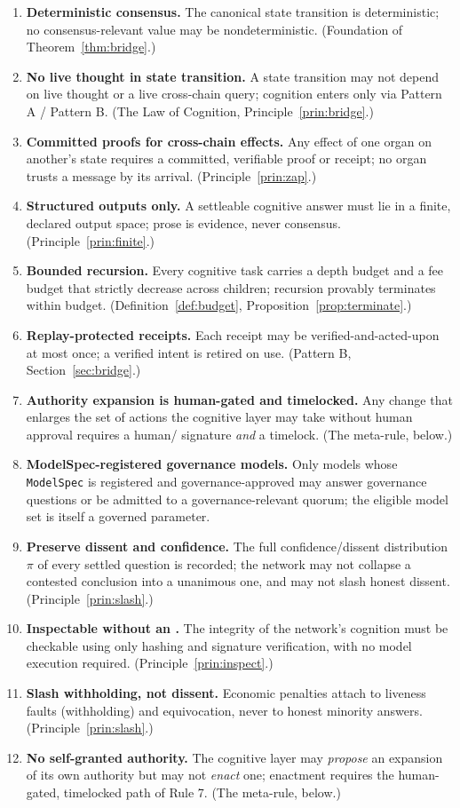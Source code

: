 \begin{enumerate}[leftmargin=2.2em,itemsep=2pt]
\item \textbf{Deterministic consensus.} The canonical state transition is deterministic; no consensus-relevant value may be nondeterministic. (Foundation of Theorem~\ref{thm:bridge}.)
\item \textbf{No live thought in state transition.} A state transition may not depend on live thought or a live cross-chain query; cognition enters only via Pattern A / Pattern B. (The Law of Cognition, Principle~\ref{prin:bridge}.)
\item \textbf{Committed proofs for cross-chain effects.} Any effect of one organ on another's state requires a committed, verifiable proof or receipt; no organ trusts a message by its arrival. (Principle~\ref{prin:zap}.)
\item \textbf{Structured outputs only.} A settle\-able cognitive answer must lie in a finite, declared output space; prose is evidence, never consensus. (Principle~\ref{prin:finite}.)
\item \textbf{Bounded recursion.} Every cognitive task carries a depth budget and a fee budget that strictly decrease across children; recursion provably terminates within budget. (Definition~\ref{def:budget}, Proposition~\ref{prop:terminate}.)
\item \textbf{Replay-protected receipts.} Each \PoT{} receipt may be verified-and-acted-upon at most once; a verified intent is retired on use. (Pattern B, Section~\ref{sec:bridge}.)
\item \textbf{Authority expansion is human-gated and timelocked.} Any change that enlarges the set of actions the cognitive layer may take without human approval requires a human/\DAO{} signature \emph{and} a timelock. (The meta-rule, below.)
\item \textbf{ModelSpec-registered governance models.} Only models whose \texttt{ModelSpec} is registered and governance-approved may answer governance questions or be admitted to a governance-relevant quorum; the eligible model set is itself a governed parameter.
\item \textbf{Preserve dissent and confidence.} The full confidence/dissent distribution $\pi$ of every settled question is recorded; the network may not collapse a contested conclusion into a unanimous one, and may not slash honest dissent. (Principle~\ref{prin:slash}.)
\item \textbf{Inspectable without an \LLM{}.} The integrity of the network's cognition must be checkable using only hashing and signature verification, with no model execution required. (Principle~\ref{prin:inspect}.)
\item \textbf{Slash withholding, not dissent.} Economic penalties attach to liveness faults (withholding) and equivocation, never to honest minority answers. (Principle~\ref{prin:slash}.)
\item \textbf{No self-granted authority.} The cognitive layer may \emph{propose} an expansion of its own authority but may not \emph{enact} one; enactment requires the human-gated, timelocked path of Rule 7. (The meta-rule, below.)
\end{enumerate}

